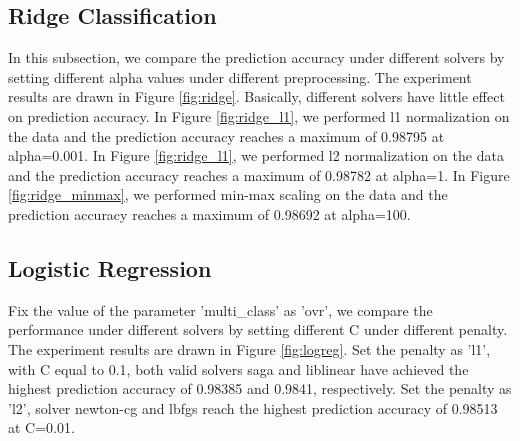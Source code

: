 \documentclass[10pt,journal,compsoc]{IEEEtran}
\begin{document}
\subsection{Ridge Classification}
\label{subsec:eva_ridge}
In this subsection, we compare the prediction accuracy under different solvers by setting different alpha values under different preprocessing. The experiment results are drawn in Figure \ref{fig:ridge}. Basically, different solvers have little effect on prediction accuracy. In Figure \ref{fig:ridge_l1}, we performed l1 normalization on the data and the prediction accuracy reaches a maximum of 0.98795 at alpha=0.001. In Figure \ref{fig:ridge_l1}, we performed l2 normalization on the data and the prediction accuracy reaches a maximum of 0.98782 at alpha=1. In Figure \ref{fig:ridge_minmax}, we performed min-max scaling on the data and the prediction accuracy reaches a maximum of 0.98692 at alpha=100.

\subsection{Logistic Regression}
\label{subsec:eva_logreg}

Fix the value of the parameter 'multi\_class' as 'ovr', we compare the performance under different solvers by setting different C under different penalty. The experiment results are drawn in Figure \ref{fig:logreg}. Set the penalty as 'l1', with C equal to 0.1, both valid solvers saga and liblinear have achieved the highest prediction accuracy of 0.98385 and 0.9841, respectively. Set the penalty as 'l2', solver newton-cg and lbfgs reach the highest prediction accuracy of 0.98513 at C=0.01.
\end{document}
